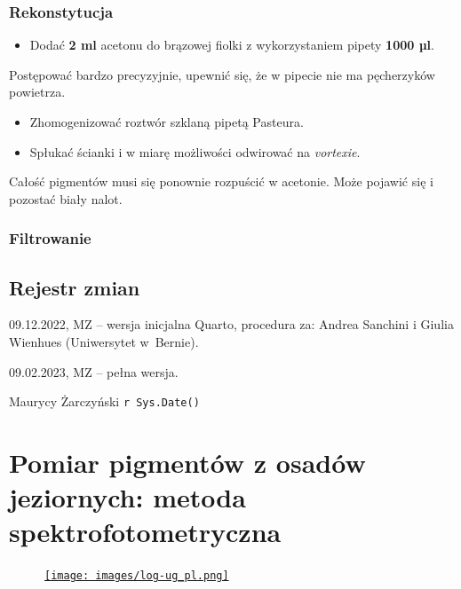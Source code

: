 \documentclass[
  letterpaper,
  DIV=11,
  numbers=noendperiod]{scrreprt}
\providecommand{\tightlist}{%
  \setlength{\itemsep}{0pt}\setlength{\parskip}{0pt}}\usepackage{longtable,booktabs,array}
\begin{document}
\hypertarget{rekonstytucja}{%
\subsection{Rekonstytucja}\label{rekonstytucja}}

\begin{itemize}
\tightlist
\item
  Dodać \textbf{2 ml} acetonu do brązowej fiolki z wykorzystaniem pipety
  \textbf{1000 µl}.
\end{itemize}

Postępować bardzo precyzyjnie, upewnić się, że w pipecie nie ma
pęcherzyków powietrza.

\begin{itemize}
\item
  Zhomogenizować roztwór szklaną pipetą Pasteura.
\item
  Spłukać ścianki i w miarę możliwości odwirować na \emph{vortexie}.
\end{itemize}

Całość pigmentów musi się ponownie rozpuścić w acetonie. Może pojawić
się i pozostać biały nalot.

\hypertarget{filtrowanie}{%
\subsection{Filtrowanie}\label{filtrowanie}}

\hypertarget{pagebreak-rejestr-zmian-5}{%
\section{\texorpdfstring{\newpage{}Rejestr
zmian}{Rejestr zmian}}\label{pagebreak-rejestr-zmian-5}}

09.12.2022, MZ -- wersja inicjalna Quarto, procedura za: Andrea Sanchini
i Giulia Wienhues (Uniwersytet w~Bernie).

09.02.2023, MZ -- pełna wersja.

Maurycy Żarczyński \texttt{r\ Sys.Date()}

\hypertarget{pomiar-pigmentuxf3w-z-osaduxf3w-jeziornych-metoda-spektrofotometryczna}{%
\chapter{Pomiar pigmentów z osadów jeziornych: metoda
spektrofotometryczna}\label{pomiar-pigmentuxf3w-z-osaduxf3w-jeziornych-metoda-spektrofotometryczna}}

\begin{figure}

\href{https://geomorfologia.ug.edu.pl}{\texttt{[image: images/log-ug\_pl.png]}}

\end{figure}
\end{document}
